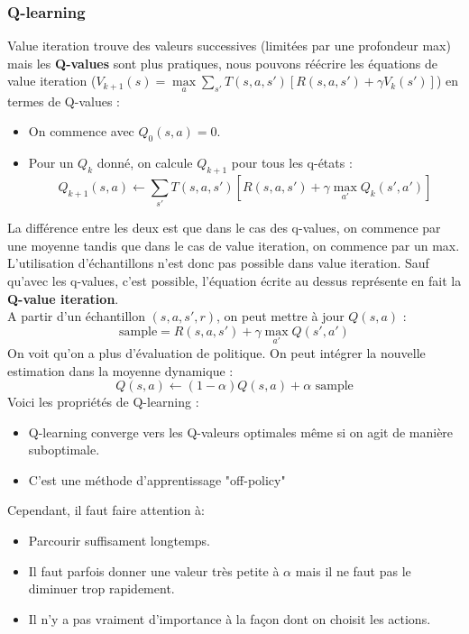 \subsubsection{Q-learning} %
\label{ssubsub:q_learning}
Value iteration trouve des valeurs successives (limitées par une profondeur max) mais les \textbf{Q-values} sont plus pratiques, 
nous pouvons réécrire les équations de value iteration ($V_{k+1}(s)=\max\limits_{a}\sum_{s'}T(s,a,s')[R(s,a,s')+\gamma V_k(s')]$)
en termes de Q-values :
\begin{itemize}[label=\textbullet]
    \item On commence avec $Q_0(s,a)=0$.
    \item Pour un $Q_k$ donné, on calcule $Q_{k+1}$ pour tous les q-états :
    \begin{equation*}
        Q_{k+1}(s,a)\leftarrow\sum_{s'}T(s,a,s')[R(s,a,s')+\gamma\max\limits_{a'}Q_k(s',a')]
    \end{equation*}
\end{itemize}
La différence entre les deux est que dans le cas des q-values, on commence par une moyenne tandis que dans le cas de value iteration,
on commence par un max. L'utilisation d'échantillons n'est donc pas possible dans value iteration. Sauf qu'avec les q-values,
c'est possible, l'équation écrite au dessus représente en fait la \textbf{Q-value iteration}.\\
A partir d'un échantillon $(s,a,s',r)$, on peut mettre à jour $Q(s,a)$ :
\begin{equation}
    \text{sample} = R(s,a,s')+\gamma\max\limits_{a'}Q(s',a')
    \label{eq:q_value}
\end{equation}
On voit qu'on a plus d'évaluation de politique. On peut intégrer la nouvelle estimation dans la moyenne dynamique :
\begin{equation*}
    Q(s,a)\leftarrow (1-\alpha)Q(s,a)+\alpha\text{ sample}
\end{equation*}
Voici les propriétés de Q-learning :
\begin{itemize}[label=\textbullet]
    \item Q-learning converge vers les Q-valeurs optimales même si on agit de manière suboptimale.
    \item C'est une méthode d'apprentissage "off-policy"
\end{itemize}
Cependant, il faut faire attention à:
\begin{itemize}[label=\textbullet]
    \item Parcourir suffisament longtemps.
    \item Il faut parfois donner une valeur très petite à $\alpha$ mais il ne faut pas le diminuer trop rapidement.
    \item Il n'y a pas vraiment d'importance à la façon dont on choisit les actions.
\end{itemize}

